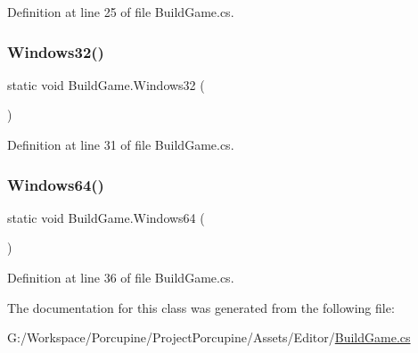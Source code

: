 Definition at line 25 of file Build\+Game.\+cs.

\mbox{\label{class_build_game_a12fefacae88f1bc407405e555f52e209}} 
\subsubsection{\texorpdfstring{Windows32()}{Windows32()}}
{\footnotesize\ttfamily static void Build\+Game.\+Windows32 (\begin{DoxyParamCaption}{ }\end{DoxyParamCaption})\hspace{0.3cm}{\ttfamily [static]}}



Definition at line 31 of file Build\+Game.\+cs.

\mbox{\label{class_build_game_ab49112148581bede60d4e424f9778de2}} 
\subsubsection{\texorpdfstring{Windows64()}{Windows64()}}
{\footnotesize\ttfamily static void Build\+Game.\+Windows64 (\begin{DoxyParamCaption}{ }\end{DoxyParamCaption})\hspace{0.3cm}{\ttfamily [static]}}



Definition at line 36 of file Build\+Game.\+cs.



The documentation for this class was generated from the following file\+:\begin{DoxyCompactItemize}
\item 
G\+:/\+Workspace/\+Porcupine/\+Project\+Porcupine/\+Assets/\+Editor/\hyperlink{_build_game_8cs}{Build\+Game.\+cs}\end{DoxyCompactItemize}
